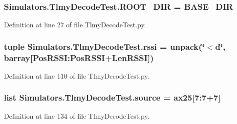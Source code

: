 \hypertarget{namespace_simulators_1_1_tlmy_decode_test_a0bc4eab667a3ff94238a2d8187797dc5}{}
\subsubsection[{R\+O\+O\+T\+\_\+\+D\+I\+R}]{\setlength{\rightskip}{0pt plus 5cm}Simulators.\+Tlmy\+Decode\+Test.\+R\+O\+O\+T\+\_\+\+D\+I\+R = B\+A\+S\+E\+\_\+\+D\+I\+R}\label{namespace_simulators_1_1_tlmy_decode_test_a0bc4eab667a3ff94238a2d8187797dc5}


Definition at line 27 of file Tlmy\+Decode\+Test.\+py.

\hypertarget{namespace_simulators_1_1_tlmy_decode_test_a2b61b80bc6b9dcbc4e7d584eb54e23b5}{}
\subsubsection[{rssi}]{\setlength{\rightskip}{0pt plus 5cm}tuple Simulators.\+Tlmy\+Decode\+Test.\+rssi = unpack(\char`\"{}$<$d\char`\"{}, barray\mbox{[}Pos\+R\+S\+S\+I\+:\+Pos\+R\+S\+S\+I+{\bf Len\+R\+S\+S\+I}\mbox{]})}\label{namespace_simulators_1_1_tlmy_decode_test_a2b61b80bc6b9dcbc4e7d584eb54e23b5}


Definition at line 110 of file Tlmy\+Decode\+Test.\+py.

\hypertarget{namespace_simulators_1_1_tlmy_decode_test_af4015191c22823cc047e34f7b3495a20}{}
\subsubsection[{source}]{\setlength{\rightskip}{0pt plus 5cm}list Simulators.\+Tlmy\+Decode\+Test.\+source = {\bf ax25}\mbox{[}7\+:7+7\mbox{]}}\label{namespace_simulators_1_1_tlmy_decode_test_af4015191c22823cc047e34f7b3495a20}


Definition at line 134 of file Tlmy\+Decode\+Test.\+py.

\hypertarget{namespace_simulators_1_1_tlmy_decode_test_ae0b90d4bc7d21c2b3339c16cafb44c61}{}
